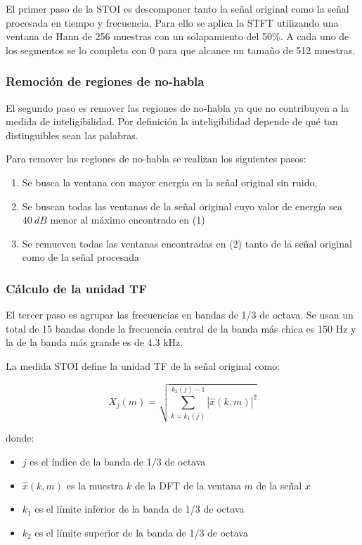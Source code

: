 El primer paso de la STOI es descomponer tanto la señal original como la señal procesada en tiempo y frecuencia. Para ello se aplica la STFT utilizando una ventana de Hann de 256 muestras con un solapamiento del 50\%. A cada uno de los segmentos se lo completa con 0 para que alcance un tamaño de 512 muestras.

\subsubsection{Remoción de regiones de no-habla}

El segundo paso es remover las regiones de no-habla ya que no contribuyen a la medida de inteligibilidad. Por definición la inteligibilidad depende de qué tan distinguibles sean las palabras.

Para remover las regiones de no-habla se realizan los siguientes pasos:

\begin{enumerate}
	\item Se busca la ventana con mayor energía en la señal original sin ruido.
	\item Se buscan todas las ventanas de la señal original cuyo valor de energía sea $\SI{40}{dB}$ menor al máximo encontrado en (1)
	\item Se remueven todas las ventanas encontradas en (2) tanto de la señal original como de la señal procesada
\end{enumerate}

\subsubsection{Cálculo de la unidad TF}

El tercer paso es agrupar las frecuencias en bandas de 1/3 de octava. Se usan un total de 15 bandas donde la frecuencia central de la banda más chica es 150 Hz y la de la banda más grande es de 4.3 kHz. 

La medida STOI define la unidad TF de la señal original como:

\begin{equation*}
	X_j(m) = \sqrt{\sum_{k=k_1(j)}^{k_2(j) - 1} | \hat{x}(k,m) |^2}
\end{equation*}

donde:

\begin{itemize}
	\item $j$ es el índice de la banda de 1/3 de octava
	\item $\hat{x}(k,m)$ es la muestra $k$ de la DFT de la ventana $m$ de la señal $x$
	\item $k_1$ es el límite inferior de la banda de 1/3 de octava
	\item $k_2$ es el límite superior de la banda de 1/3 de octava
\end{itemize}

